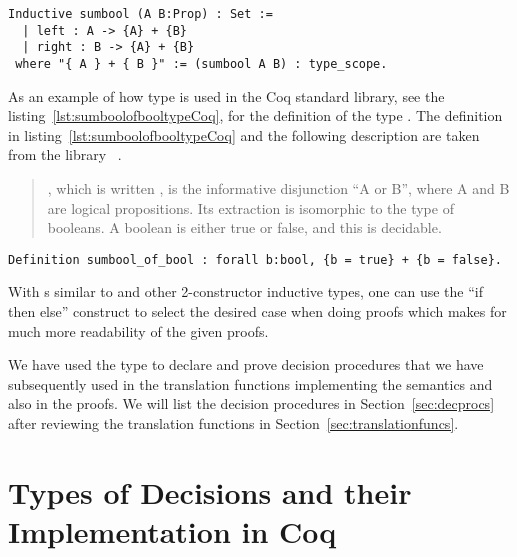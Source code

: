 \begin{lstlisting}
Inductive sumbool (A B:Prop) : Set :=
  | left : A -> {A} + {B}
  | right : B -> {A} + {B}
 where "{ A } + { B }" := (sumbool A B) : type_scope.
\end{lstlisting}

As an example of how  type is used in the Coq standard library, see the listing~\ref{lst:sumboolofbooltypeCoq}, for the definition of the type . The definition in listing~\ref{lst:sumboolofbooltypeCoq} and the following description are taken from the library ~\cite{Coq:manual}.
\begin{quote}
, which is written , is the informative disjunction ``A or B'', where A and B are logical propositions. Its extraction is isomorphic to the type of booleans. A boolean is either true or false, and this is decidable. 
\end{quote}

\begin{lstlisting}
Definition sumbool_of_bool : forall b:bool, {b = true} + {b = false}.
\end{lstlisting}
With s similar to  and other 2-constructor inductive types, one can use the ``if then else'' construct to select the desired case when doing proofs which makes for much more readability of the given proofs.


We have used the  type to declare and prove decision procedures that we have subsequently used in the translation functions implementing the semantics and also in the proofs. We will list the decision procedures in Section~\ref{sec:decprocs} after reviewing the translation functions in Section~\ref{sec:translationfuncs}.


\section{Types of Decisions and their Implementation in Coq}\label{sec:answerandresulttypes}

